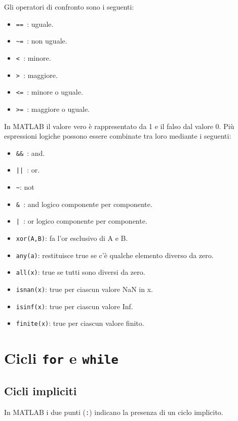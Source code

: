 Gli operatori di confronto sono i seguenti:
\begin{itemize}

	\item	\texttt{== }: uguale.
	\item	\texttt{\textasciitilde= }: non uguale.
	\item	\texttt{< }: minore.
	\item	\texttt{> }: maggiore.
	\item	\texttt{<= }: minore o uguale.
	\item 	\texttt{>= }: maggiore o uguale.

\end{itemize}

In MATLAB il valore vero è rappresentato da 1 e il falso dal valore 0.
Più espressioni logiche possono essere combinate tra loro mediante i seguenti:
\begin{itemize}

	\item	\texttt{\&\& }: and.
	\item	\texttt{|| }: or.
	\item	\texttt{\textasciitilde }: not
	\item	\texttt{\& }: and logico componente per componente.
	\item	\texttt{| }: or logico componente per componente.
    \item	\texttt{xor(A,B)}: fa l'or esclusivo di A e B.
    \item	\texttt{any(a)}: restituisce true se c'è qualche elemento diverso da zero.
    \item	\texttt{all(x)}: true se tutti sono diversi da zero. 
    \item	\texttt{isnan(x)}: true per ciascun valore NaN in x.
    \item	\texttt{isinf(x)}: true per ciascun valore Inf.
    \item	\texttt{finite(x)}: true per ciascun valore finito.

\end{itemize}


\section{Cicli \texttt{for} e \texttt{while}}

\subsection{Cicli impliciti}
In MATLAB i due punti (\texttt{:}) indicano la presenza di un ciclo implicito. \\

